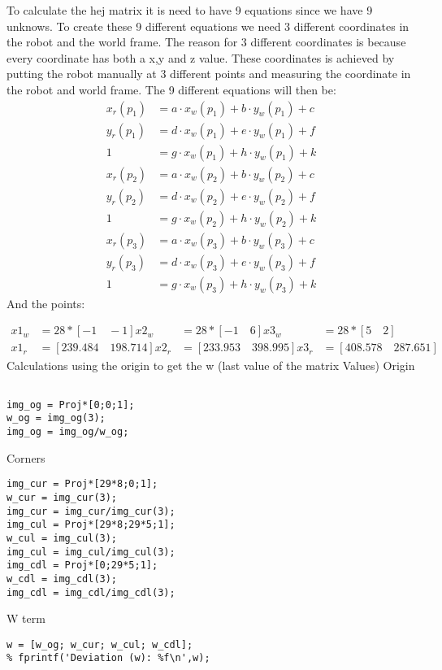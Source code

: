 To calculate the hej matrix it is need to have 9 equations since we have 9 unknows. To create these 9 different equations we need 3 different coordinates in the robot and the world frame. The reason for 3 different coordinates is because every coordinate has both a x,y and z value. These coordinates is achieved by putting the robot manually at 3 different points and measuring the coordinate in the robot and world frame. The 9 different equations will then be:
\begin{align*} 
x_r(p_1) &= a\cdot x_w(p_1) + b\cdot y_w(p_1) + c \\
y_r(p_1) &= d\cdot x_w(p_1) + e\cdot y_w(p_1) + f \\
1 &= g\cdot x_w(p_1) + h\cdot y_w(p_1) + k \\
x_r(p_2) &= a\cdot x_w(p_2) + b\cdot y_w(p_2) + c\\
y_r(p_2) &= d\cdot x_w(p_2) + e\cdot y_w(p_2) + f \\
1 &= g\cdot x_w(p_2) + h\cdot y_w(p_2) + k \\
x_r(p_3) &= a\cdot x_w(p_3) + b\cdot y_w(p_3) + c \\
y_r(p_3) &= d\cdot x_w(p_3) + e\cdot y_w(p_3) + f \\
1 &= g\cdot x_w(p_3) + h\cdot y_w(p_3) + k
\end{align*}
And the points:

\begin{align*}
x1_w&=28*[-1\quad -1] x2_w&=28*[-1\quad 6]  x3_w&=28*[5\quad 2]\\
x1_r&=[239.484\quad 198.714] x2_r&=[233.953\quad 398.995]   x3_r&=[408.578\quad 287.651]
\end{align*}
Calculations using the origin to get the w (last value of the matrix Values)
Origin
\begin{lstlisting}

img_og = Proj*[0;0;1];
w_og = img_og(3);
img_og = img_og/w_og;
\end{lstlisting}
Corners
\begin{lstlisting}
img_cur = Proj*[29*8;0;1];
w_cur = img_cur(3);
img_cur = img_cur/img_cur(3);
img_cul = Proj*[29*8;29*5;1];
w_cul = img_cul(3);
img_cul = img_cul/img_cul(3);
img_cdl = Proj*[0;29*5;1];
w_cdl = img_cdl(3);
img_cdl = img_cdl/img_cdl(3);
\end{lstlisting}
W term
\begin{lstlisting}
w = [w_og; w_cur; w_cul; w_cdl];
% fprintf('Deviation (w): %f\n',w);
\end{lstlisting}
